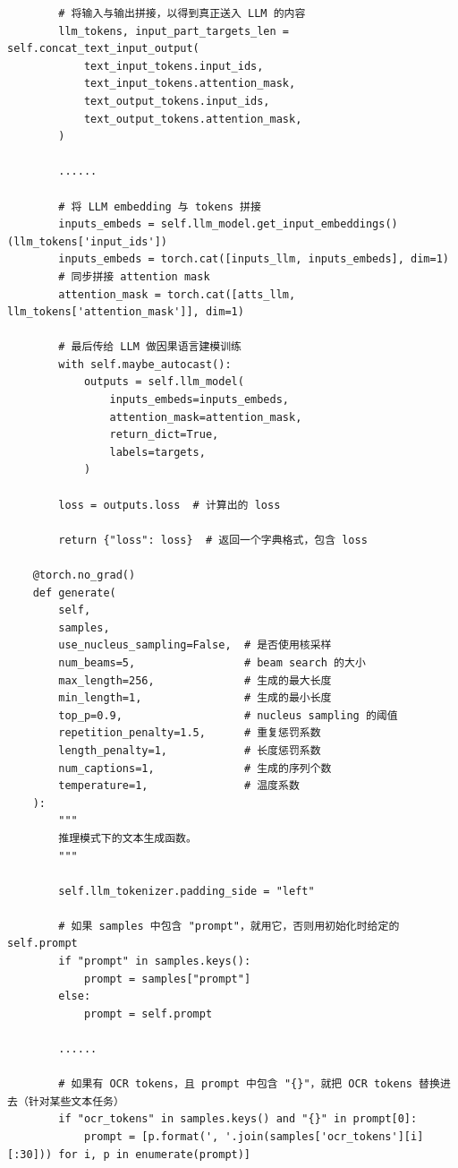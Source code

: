\documentclass[zihao=false,fontset=windows]{ctexart}
\begin{document}
\begin{feishucode}
\begin{lstlisting}
        # 将输入与输出拼接，以得到真正送入 LLM 的内容
        llm_tokens, input_part_targets_len = self.concat_text_input_output(
            text_input_tokens.input_ids,
            text_input_tokens.attention_mask,
            text_output_tokens.input_ids,
            text_output_tokens.attention_mask,
        )

        ......

        # 将 LLM embedding 与 tokens 拼接
        inputs_embeds = self.llm_model.get_input_embeddings()(llm_tokens['input_ids'])
        inputs_embeds = torch.cat([inputs_llm, inputs_embeds], dim=1)
        # 同步拼接 attention mask
        attention_mask = torch.cat([atts_llm, llm_tokens['attention_mask']], dim=1)

        # 最后传给 LLM 做因果语言建模训练
        with self.maybe_autocast():
            outputs = self.llm_model(
                inputs_embeds=inputs_embeds,
                attention_mask=attention_mask,
                return_dict=True,
                labels=targets,
            )

        loss = outputs.loss  # 计算出的 loss

        return {"loss": loss}  # 返回一个字典格式，包含 loss

    @torch.no_grad()
    def generate(
        self,
        samples,
        use_nucleus_sampling=False,  # 是否使用核采样
        num_beams=5,                 # beam search 的大小
        max_length=256,              # 生成的最大长度
        min_length=1,                # 生成的最小长度
        top_p=0.9,                   # nucleus sampling 的阈值
        repetition_penalty=1.5,      # 重复惩罚系数
        length_penalty=1,            # 长度惩罚系数
        num_captions=1,              # 生成的序列个数
        temperature=1,               # 温度系数
    ):
        """
        推理模式下的文本生成函数。
        """

        self.llm_tokenizer.padding_side = "left"

        # 如果 samples 中包含 "prompt"，就用它，否则用初始化时给定的 self.prompt
        if "prompt" in samples.keys():
            prompt = samples["prompt"]
        else:
            prompt = self.prompt

        ......

        # 如果有 OCR tokens，且 prompt 中包含 "{}"，就把 OCR tokens 替换进去（针对某些文本任务）
        if "ocr_tokens" in samples.keys() and "{}" in prompt[0]:
            prompt = [p.format(', '.join(samples['ocr_tokens'][i][:30])) for i, p in enumerate(prompt)]


\end{lstlisting}
\end{feishucode}
\end{document}
